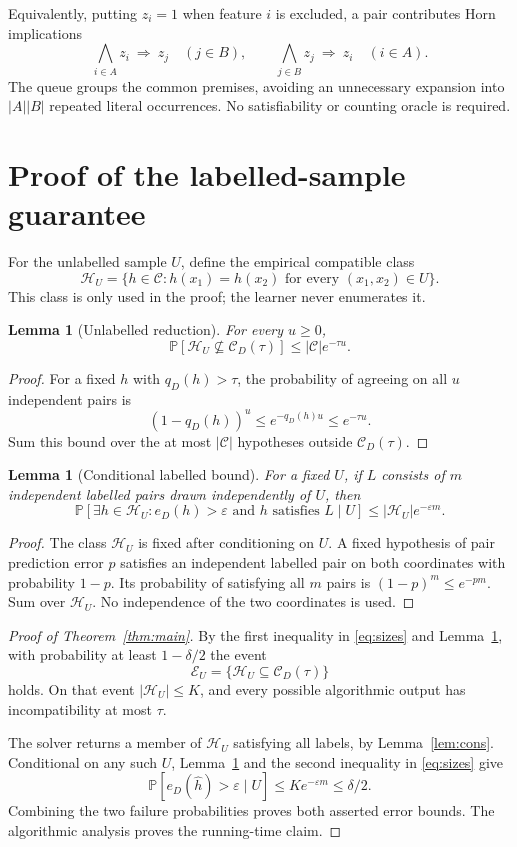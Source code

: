 \documentclass[11pt,a4paper]{article}
\newtheorem{lemma}[theorem]{Lemma}
\newcommand{\C}{\mathcal C}
\newcommand{\HU}{\mathcal H_U}
\newcommand{\Prb}{\mathbb P}
\begin{document}
Equivalently, putting \(z_i=1\) when feature \(i\) is excluded, a pair
contributes Horn implications
\[
 \bigwedge_{i\in A}z_i\ \Longrightarrow\ z_j \quad(j\in B),
 \qquad
 \bigwedge_{j\in B}z_j\ \Longrightarrow\ z_i \quad(i\in A).
\]
The queue groups the common premises, avoiding an unnecessary expansion
into \(|A||B|\) repeated literal occurrences. No satisfiability or counting
oracle is required.

\section{Proof of the labelled-sample guarantee}

For the unlabelled sample \(U\), define the empirical compatible class
\[
 \HU=\{h\in\C:h(x_1)=h(x_2)\text{ for every }(x_1,x_2)\in U\}.
\]
This class is only used in the proof; the learner never enumerates it.

\begin{lemma}[Unlabelled reduction]\label{lem:reduction}
For every \(u\ge0\),
\[
 \Prb[\HU\not\subseteq\C_D(\tau)]\le|\C|e^{-\tau u}.
\]
\end{lemma}
\begin{proof}
For a fixed \(h\) with \(q_D(h)>\tau\), the probability of agreeing on all
\(u\) independent pairs is
\[
 (1-q_D(h))^u\le e^{-q_D(h)u}\le e^{-\tau u}.
\]
Sum this bound over the at most \(|\C|\) hypotheses outside \(\C_D(\tau)\).
\end{proof}

\begin{lemma}[Conditional labelled bound]\label{lem:label}
For a fixed \(U\), if \(L\) consists of \(m\) independent labelled pairs
drawn independently of \(U\), then
\[
 \Prb[\exists h\in\HU:e_D(h)>\varepsilon
            \text{ and }h\text{ satisfies }L\mid U]
 \le|\HU|e^{-\varepsilon m}.
\]
\end{lemma}
\begin{proof}
The class \(\HU\) is fixed after conditioning on \(U\).
A fixed hypothesis of pair prediction error \(p\) satisfies an independent
labelled pair on both coordinates with probability \(1-p\).
Its probability of satisfying all \(m\) pairs is \((1-p)^m\le e^{-pm}\).
Sum over \(\HU\). No independence of the two coordinates is used.
\end{proof}

\begin{proof}[Proof of Theorem~\ref{thm:main}]
By the first inequality in \eqref{eq:sizes} and Lemma~\ref{lem:reduction},
with probability at least \(1-\delta/2\) the event
\[
 \mathcal E_U=\{\HU\subseteq\C_D(\tau)\}
\]
holds. On that event \(|\HU|\le K\), and every possible algorithmic output
has incompatibility at most \(\tau\).

The solver returns a member of \(\HU\) satisfying all labels, by
Lemma~\ref{lem:cons}. Conditional on any such \(U\),
Lemma~\ref{lem:label} and the second inequality in \eqref{eq:sizes} give
\[
 \Prb[e_D(\widehat h)>\varepsilon\mid U]
 \le K e^{-\varepsilon m}\le\delta/2.
\]
Combining the two failure probabilities proves both asserted error bounds.
The algorithmic analysis proves the running-time claim.
\end{proof}
\end{document}
